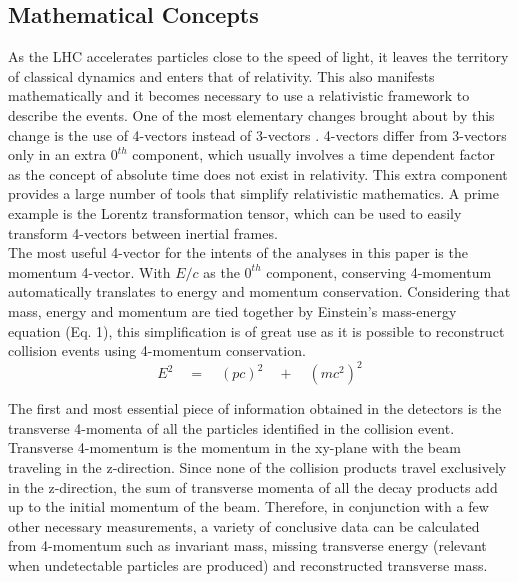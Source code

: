 \documentclass[runningheads,a4paper]{llncs}
\begin{document}
\subsection{Mathematical Concepts}

As the LHC accelerates particles close to the speed of light, it leaves the territory of classical dynamics and enters that of relativity. This also manifests mathematically and it becomes necessary to use a relativistic framework to describe the events. One of the most elementary changes brought about by this change is the use of 4-vectors instead of 3-vectors \cite{griffithsintroduction}. 4-vectors differ from 3-vectors only in an extra ${0}^{th}$ component, which usually involves a time dependent factor as the concept of absolute time does not exist in relativity. This extra component provides a large number of tools that simplify relativistic mathematics. A prime example is the Lorentz transformation tensor, which can be used to easily transform 4-vectors between inertial frames.\\

The most useful 4-vector for the intents of the analyses in this paper is the momentum 4-vector. With ${E}/{c}$ as the ${0}^{th}$ component, conserving 4-momentum automatically translates to energy and momentum conservation. Considering that mass, energy and momentum are tied together by Einstein's mass-energy equation (Eq. 1), this simplification is of great use as it is possible to reconstruct collision events using 4-momentum conservation. \\

\begin{equation}
{ E }^{ 2 }\quad ={ \quad (pc) }^{ 2 }\quad +\quad { (m{ c }^{ 2 }) }^{ 2 }
\end{equation}

The first and most essential piece of information obtained in the detectors is the transverse 4-momenta of all the particles identified in the collision event. Transverse 4-momentum is the momentum in the xy-plane with the beam traveling in the z-direction. Since none of the collision products travel exclusively in the z-direction, the sum of transverse momenta of all the decay products add up to the initial momentum of the beam. Therefore, in conjunction with a few other necessary measurements, a variety of conclusive data can be calculated from 4-momentum such as invariant mass, missing transverse energy (relevant when undetectable particles are produced) and reconstructed transverse mass. \\
\end{document}
